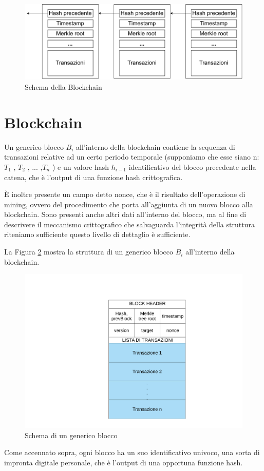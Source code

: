 \begin{figure}[h!]
    \centering
    \includegraphics[scale=0.6]{Images/blockChaining.pdf}
    \caption{Schema della Blockchain}
    \label{fig:blockchain}
\end{figure}
\FloatBarrier
\section{Blockchain}
Un generico blocco $B_i$ all’interno della blockchain contiene la sequenza di transazioni relative ad un certo periodo temporale (supponiamo che esse siano n: $T_1$ , $T_2$ , ... ,$T_n$ ) e un valore hash $h_{i-1}$ identificativo del blocco precedente nella catena, che è l’output di una funzione hash crittografica.

È inoltre presente un campo detto nonce, che è il risultato dell’operazione di mining, ovvero del procedimento che porta all’aggiunta di un nuovo blocco alla blockchain. Sono presenti anche altri dati all’interno del blocco, ma al fine di descrivere il meccanismo crittografico che salvaguarda l’integrità della struttura riteniamo sufficiente questo livello di dettaglio è sufficiente.

La Figura \ref{fig:blocchi} mostra la struttura di un generico blocco $B_i$ all’interno della blockchain.
\begin{figure}[h!]
    \centering
    \includegraphics[scale=0.4, trim = 0cm 0cm 0cm 3cm, clip]{Images/blocco_singolo.pdf}
    \caption{Schema di un generico blocco}
    \label{fig:blocchi}
\end{figure}
\FloatBarrier
Come accennato sopra, ogni blocco ha un suo identificativo univoco, una sorta di impronta digitale personale, che è l’output di una opportuna funzione hash.

